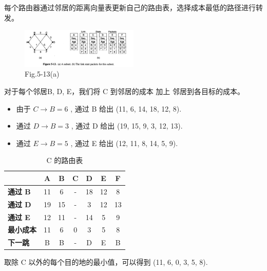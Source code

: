 每个路由器通过邻居的距离向量表更新自己的路由表，选择成本最低的路径进行转发。

\begin{figure}[H]
  \centering
  \includegraphics[width=0.5\textwidth]{lec5/5-13.png}
  \caption{Fig.5-13(a)}
\end{figure}

对于每个邻居B, D, E，我们将 C 到邻居的成本 加上 邻居到各目标的成本。

\begin{itemize}
  \item 由于 $ C \rightarrow B = 6 $ , 通过 B 给出 (11, 6, 14, 18, 12, 8). 
  \item 通过 $ D \rightarrow B = 3 $ , 通过 D 给出 (19, 15, 9, 3, 12, 13). 
  \item 通过 $ E \rightarrow B = 5 $ , 通过 E 给出 (12, 11, 8, 14, 5, 9).
\end{itemize}

\begin{table}[H]
  \centering
  \renewcommand{\arraystretch}{1.2} %
  \begin{tabular}{|l|c|c|c|c|c|c|} 
  \hline
  \textbf{}          & \textbf{A} & \textbf{B} & \textbf{C} & \textbf{D} & \textbf{E} & \textbf{F} \\ \hline
  \textbf{通过 B}   & 11         & 6          & -          & 18         & 12         & 8          \\ \hline
  \textbf{通过 D}   & 19         & 15         & -          & 3          & 12         & 13         \\ \hline
  \textbf{通过 E}   & 12         & 11         & -          & 14         & 5          & 9          \\ \hline
  \textbf{最小成本} & 11         & 6          & 0          & 3          & 5          & 8          \\ \hline
  \textbf{下一跳}   & B          & B          & -          & D          & E          & B          \\ \hline
  \end{tabular}
  \caption{C 的路由表}
  \label{tab:reverse_routing_table}
\end{table}

取除 C 以外的每个目的地的最小值，可以得到 (11, 6, 0, 3, 5, 8). 


